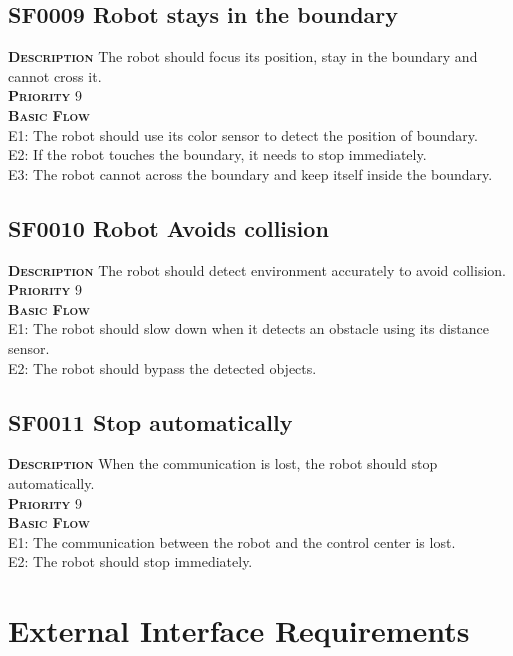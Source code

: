 \documentclass[11pt, a4paper]{article}
\begin{document}
\subsection{SF0009 Robot stays in the boundary}
\textsc{\bfseries Description} The robot should focus its position, stay in the boundary and cannot cross it.\\
\textsc{\bfseries Priority} 9\\
\textsc{\bfseries Basic Flow} \\
\textsc{E1:} The robot should use its color sensor to detect the position of boundary.\\
\textsc{E2:} If the robot touches the boundary, it needs to stop immediately.\\
\textsc{E3:} The robot cannot across the boundary and keep itself inside the boundary.\\

\subsection{SF0010 Robot Avoids collision}
\textsc{\bfseries Description} The robot should detect environment accurately to avoid collision.\\
\textsc{\bfseries Priority} 9\\
\textsc{\bfseries Basic Flow} \\
\textsc{E1:} The robot should slow down when it detects an obstacle using its distance sensor.\\
\textsc{E2:} The robot should bypass the detected objects.\\

\subsection{SF0011 Stop automatically}
\textsc{\bfseries Description} When the communication is lost, the robot should stop automatically.\\
\textsc{\bfseries Priority} 9\\
\textsc{\bfseries Basic Flow} \\
\textsc{E1:} The communication between the robot and the control center is lost.\\
\textsc{E2:} The robot should stop immediately.\\
\newpage

\section{External Interface Requirements}
\end{document}
